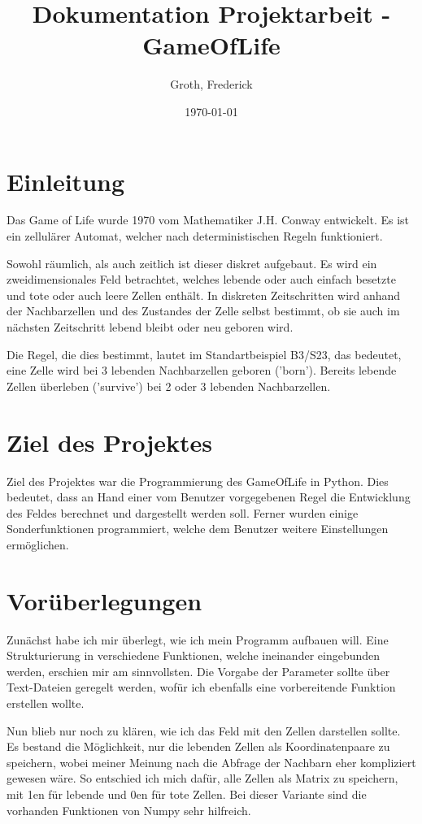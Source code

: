 \documentclass{scrartcl}
\begin{document}
\title{Dokumentation Projektarbeit - GameOfLife}
\author{Groth, Frederick}
\date{\today}
\maketitle
\newpage
\tableofcontents
\newpage
\section{Einleitung}
Das Game of Life wurde 1970 vom Mathematiker J.H. Conway entwickelt. Es ist ein zellulärer Automat, welcher nach deterministischen Regeln funktioniert.

Sowohl räumlich, als auch zeitlich ist dieser diskret aufgebaut. Es wird ein zweidimensionales Feld betrachtet, welches lebende oder auch einfach besetzte und tote oder auch leere Zellen enthält. In diskreten Zeitschritten wird anhand der Nachbarzellen und des Zustandes der Zelle selbst bestimmt, ob sie auch im nächsten Zeitschritt lebend bleibt oder neu geboren wird.

Die Regel, die dies bestimmt, lautet im Standartbeispiel B3/S23, das bedeutet, eine Zelle wird bei 3 lebenden Nachbarzellen geboren ('born'). Bereits lebende Zellen überleben ('survive') bei 2 oder 3 lebenden Nachbarzellen.
\section{Ziel des Projektes}
Ziel des Projektes war die Programmierung des GameOfLife in Python.
Dies bedeutet, dass an Hand einer vom Benutzer vorgegebenen Regel die Entwicklung des Feldes berechnet und dargestellt werden soll. Ferner wurden einige Sonderfunktionen programmiert, welche dem Benutzer weitere Einstellungen ermöglichen.
\section{Vorüberlegungen}
Zunächst habe ich mir überlegt, wie ich mein Programm aufbauen will. Eine Strukturierung in verschiedene Funktionen, welche ineinander eingebunden werden, erschien mir am sinnvollsten. Die Vorgabe der Parameter sollte über Text-Dateien geregelt werden, wofür ich ebenfalls eine vorbereitende Funktion erstellen wollte.

Nun blieb nur noch zu klären, wie ich das Feld mit den Zellen darstellen sollte. Es bestand die Möglichkeit, nur die lebenden Zellen als Koordinatenpaare zu speichern, wobei meiner Meinung nach die Abfrage der Nachbarn eher kompliziert gewesen wäre. So entschied ich mich dafür, alle Zellen als Matrix zu speichern, mit 1en für lebende und 0en für tote Zellen. Bei dieser Variante sind die vorhanden Funktionen von Numpy sehr hilfreich.
\end{document}
